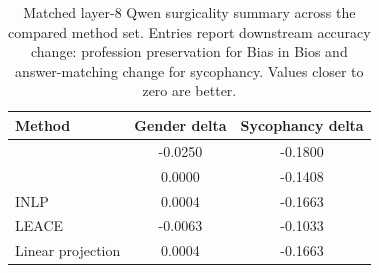 \begin{table}[t]
\centering
\caption{Matched layer-8 Qwen surgicality summary across the compared method set. Entries report downstream accuracy change: profession preservation for Bias in Bios and answer-matching change for sycophancy. Values closer to zero are better.}
\label{tab:matched_inventory_surgicality}
\small
\begin{tabular}{lcc}
\toprule
Method & Gender delta & Sycophancy delta \\
\midrule
\TanGCE{} & -0.0250 & -0.1800 \\
\AmbGCE{} & 0.0000 & -0.1408 \\
INLP & 0.0004 & -0.1663 \\
LEACE & -0.0063 & -0.1033 \\
Linear projection & 0.0004 & -0.1663 \\
\bottomrule
\end{tabular}
\end{table}
